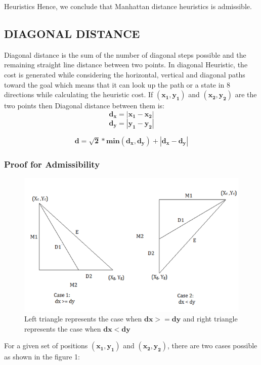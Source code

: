 \documentclass[12pt]{article}
\begin{document}
\begin{section}{Heuristics}
Hence, we conclude that Manhattan distance heuristics is admissible.


\subsection{DIAGONAL DISTANCE}Diagonal distance is the sum of the number of diagonal steps possible and the remaining straight line distance between two points. In diagonal Heuristic, the cost is generated while considering the horizontal, vertical and diagonal paths toward the goal which means that it can look up the path or a state in 8 directions while calculating the heuristic cost.
If $\mathbf{(x_1, y_1)}$ and $\mathbf{(x_2, y_2)}$ are the two points then Diagonal distance between them is:
\[
 {\mathbf{d_x=|x_1-x_2|}} 
\]
\[
 {\mathbf{d_y=|y_1-y_2|}} 
\]

\begin{equation} \mathbf{d=\sqrt{2}*min(d_x,d_y)+|d_x-d_y|} \end{equation}  
\subsubsection{Proof for Admissibility}

\begin{figure}[H]
\label{triangle}
\begin{center}
\includegraphics[width=5.0in, scale=0.25]{triange.png}
\caption{Left triangle represents the case when $\mathbf{dx >= dy}$ and right triangle represents the case when $\mathbf{dx < dy}$ }
\end{center}
\end{figure}

For a given set of positions $\mathbf{(x_1, y_1)}$ and $\mathbf{(x_2, y_2)}$, there are two cases possible as shown in the figure 1:


\end{section}
\end{document}
